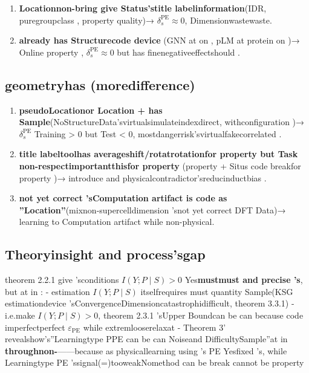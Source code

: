 \documentclass[
  12pt,
]{article}
\providecommand{\tightlist}{%
  \setlength{\itemsep}{0pt}\setlength{\parskip}{0pt}}
\begin{document}
\begin{enumerate}
\def\labelenumi{\arabic{enumi}.}
\setcounter{enumi}{3}
\tightlist
\item
  \textbf{Locationnon-bring give Status'stitle labelinformation}(IDR, puregroupclass , property quality)→
  \(\delta_s^{\text{PE}} \approx 0\), Dimensionwastewaste. 
\item
  \textbf{already has Structurecode device }(GNN at on , pLM at protein on )→
  Online property , \(\delta_s^{\text{PE}} \approx 0\) but has finenegativeeffectshould . 
\end{enumerate}

\subsection{geometryhas  (moredifference)}\label{ux5b83ux4f55ux65f6ux6709ux5bb3ux52a0ux4e86ux66f4ux5dee}

\begin{enumerate}
\def\labelenumi{\arabic{enumi}.}
\setcounter{enumi}{5}
\tightlist
\item
  \textbf{pseudoLocationor Location +
  has Sample}(NoStructureData'svirtualsimulateindexdirect, withconfiguration )→ \(\delta_s^{\text{PE}}\)
  Training \textgreater{} 0 but Test \textless{} 0, mostdangerrisk'svirtualfakecorrelated . 
\item
  \textbf{title labeltoolhas averageshift/rotatrotationfor property but Task non-respectimportantthisfor property }(property  + Situs
  code breakfor property )→ introduce and physicalcontradictor'sreducinductbias . 
\item
  \textbf{not yet correct 'sComputation artifact
  is code as ''Location''}(mixnon-supercelldimension 'snot yet correct  DFT Data)→ learning to Computation
  artifact while non-physical. 
\end{enumerate}

\subsection{Theoryinsight and process'sgap }\label{ux7406ux8bbaux6d1eux5bdfux4e0eux5de5ux7a0bux73b0ux5b9eux7684ux9e3fux6c9f}

theorem  2.2.1 give 'sconditions \(I(Y; P \mid S) > 0\)
Yes\textbf{mustmust and precise 's}, but at in :  - estimation \(I(Y; P \mid S)\)
itselfrequires must quantity Sample(KSG estimationdevice 'sConvergenceDimensioncatastrophidifficult, theorem  3.3.1) - i.e.make 
\(I(Y; P \mid S) > 0\), theorem  2.3.1 'sUpper Boundcan be can because code imperfectperfect
\(\varepsilon_{\text{PE}}\) while extremlooserelaxat - Theorem 3' revealshow's''Learningtype  PPE
can be can Noiseand DifficultySample''at in \textbf{throughnon-}------because as physicallearning using 's
PE Yesfixed 's, while Learningtype  PE 'ssignal(=)tooweakNomethod can be break cannot be property 
\end{document}
